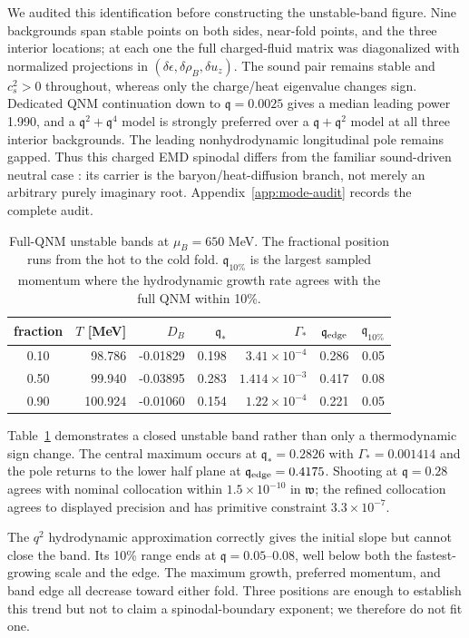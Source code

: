 \documentclass[11pt,a4paper]{article}
\newcommand{\mub}{\mu_B}
\newcommand{\rhob}{\rho_B}
\newcommand{\w}{\mathfrak{w}}
\newcommand{\q}{\mathfrak{q}}
\begin{document}
We audited this identification before constructing the unstable-band figure.
Nine backgrounds span stable points on both sides, near-fold points, and the
three interior locations; at each one the full charged-fluid matrix was
diagonalized with normalized projections in
$(\delta\epsilon,\delta\rhob,\delta u_z)$.  The sound pair remains stable and
$c_s^2>0$ throughout, whereas only the charge/heat eigenvalue changes sign.
Dedicated QNM continuation down to $\q=0.0025$ gives a median leading power
1.990, and a $\q^2+\q^4$ model is strongly preferred over a
$\q+\q^2$ model at all three interior backgrounds.  The leading
nonhydrodynamic longitudinal pole remains gapped.  Thus this charged EMD
spinodal differs from the familiar sound-driven neutral case
\cite{Janik:2015waa}: its carrier is the baryon/heat-diffusion branch, not
merely an arbitrary purely imaginary root.  Appendix~\ref{app:mode-audit}
records the complete audit.

\begin{table}[t]
 \centering
 \caption{Full-QNM unstable bands at $\mub=650$ MeV.  The fractional position
 runs from the hot to the cold fold.  $\q_{10\%}$ is the largest sampled
 momentum where the hydrodynamic growth rate agrees with the full QNM within
 10\%.}
 \label{tab:spinodal}
 \begin{tabular}{@{}crrrrrr@{}}
 \toprule
 fraction & $T$ [MeV] & $D_B$ & $\q_*$ & $\Gamma_*$ & $\q_{\rm edge}$ & $\q_{10\%}$\\
 \midrule
 0.10 & 98.786 & -0.01829 & 0.198 & $3.41\times10^{-4}$ & 0.286 & 0.05\\
 0.50 & 99.940 & -0.03895 & 0.283 & $1.414\times10^{-3}$ & 0.417 & 0.08\\
 0.90 & 100.924 & -0.01060 & 0.154 & $1.22\times10^{-4}$ & 0.221 & 0.05\\
 \bottomrule
 \end{tabular}
\end{table}

Table~\ref{tab:spinodal} demonstrates a closed unstable band rather than only
a thermodynamic sign change.  The central maximum occurs at
$\q_*=0.2826$ with $\Gamma_*=0.001414$ and the pole returns to the lower half
plane at $\q_{\rm edge}=0.4175$.  Shooting at $\q=0.28$ agrees with nominal
collocation within $1.5\times10^{-10}$ in $\w$; the refined collocation agrees
to displayed precision and has primitive constraint $3.3\times10^{-7}$.

The $q^2$ hydrodynamic approximation correctly gives the initial slope but
cannot close the band.  Its 10\% range ends at $\q=0.05$--0.08, well below both
the fastest-growing scale and the edge.  The maximum growth, preferred
momentum, and band edge all decrease toward either fold.  Three positions are
enough to establish this trend but not to claim a spinodal-boundary exponent;
we therefore do not fit one.
\end{document}
